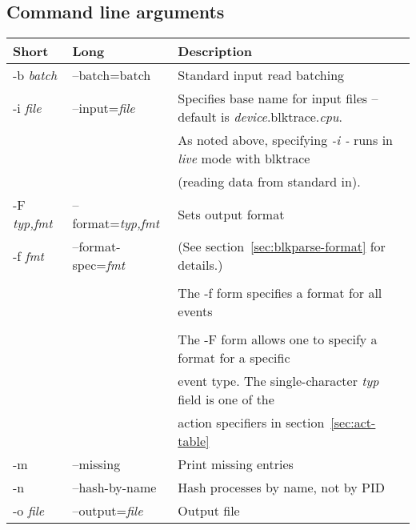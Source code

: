 \documentclass{article}
\begin{document}
\newpage\subsection{\label{sec:blkparse-args}Command line arguments}
\begin{tabular}{|l|l|l|}\hline
Short              & Long                       & Description \\ \hline\hline
-b \emph{batch}    & --batch={batch}            & Standard input read batching \\ \hline

-i \emph{file}     & --input=\emph{file}        & Specifies base name for input files -- default is \emph{device}.blktrace.\emph{cpu}. \\
                   &                            & As noted above, specifying \emph{-i -} runs in \emph{live} mode with blktrace \\
		   &                            & (reading data from standard in). \\ \hline

-F \emph{typ,fmt}  & --format=\emph{typ,fmt}    & Sets output format \\
-f \emph{fmt}      & --format-spec=\emph{fmt}   & (See section~\ref{sec:blkparse-format} for details.) \\ 
                   &                            & \\
		   &                            & The -f form specifies a format for all events \\
                   &                            & \\
		   &                            & The -F form allows one to specify a format for a specific \\
		   &                            & event type. The single-character \emph{typ} field is one of the \\
		   &                            & action specifiers in section~\ref{sec:act-table} \\ \hline


-m                 & --missing                  & Print missing entries\\ \hline

-n                 & --hash-by-name             & Hash processes by name, not by PID\\ \hline

-o \emph{file}     & --output=\emph{file}       & Output file \\ \hline


\end{tabular}
\end{document}
